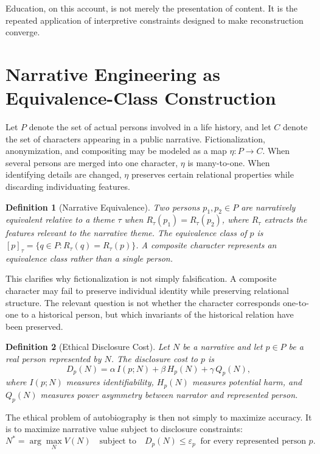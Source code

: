 \documentclass[11pt]{article}
\theoremstyle{plain}
\newtheorem{definition}{Definition}[section]
\begin{document}
Education, on this account, is not merely the presentation of content. It is the repeated application of interpretive constraints designed to make reconstruction converge.

\section{Narrative Engineering as Equivalence-Class Construction}

Let $P$ denote the set of actual persons involved in a life history, and let $C$ denote the set of characters appearing in a public narrative. Fictionalization, anonymization, and compositing may be modeled as a map $\eta : P \to C$. When several persons are merged into one character, $\eta$ is many-to-one. When identifying details are changed, $\eta$ preserves certain relational properties while discarding individuating features.

\begin{definition}[Narrative Equivalence]
Two persons $p_1,p_2 \in P$ are narratively equivalent relative to a theme $\tau$ when $R_\tau(p_1) = R_\tau(p_2)$, where $R_\tau$ extracts the features relevant to the narrative theme. The equivalence class of $p$ is $[p]_\tau = \{q \in P : R_\tau(q) = R_\tau(p)\}$. A composite character represents an equivalence class rather than a single person.
\end{definition}

This clarifies why fictionalization is not simply falsification. A composite character may fail to preserve individual identity while preserving relational structure. The relevant question is not whether the character corresponds one-to-one to a historical person, but which invariants of the historical relation have been preserved.

\begin{definition}[Ethical Disclosure Cost]
Let $N$ be a narrative and let $p \in P$ be a real person represented by $N$. The disclosure cost to $p$ is
\[
D_p(N) = \alpha\, I(p;N) + \beta\, H_p(N) + \gamma\, Q_p(N),
\]
where $I(p;N)$ measures identifiability, $H_p(N)$ measures potential harm, and $Q_p(N)$ measures power asymmetry between narrator and represented person.
\end{definition}

The ethical problem of autobiography is then not simply to maximize accuracy. It is to maximize narrative value subject to disclosure constraints:
\[
N^\ast = \arg\max_N V(N) \quad \text{subject to} \quad D_p(N) \leq \varepsilon_p \ \text{ for every represented person } p.
\]
\end{document}
